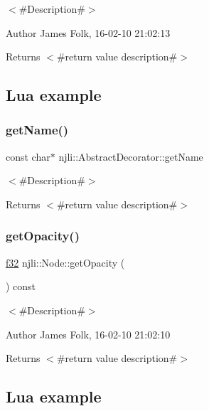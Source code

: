 $<$\#\+Description\#$>$ 

\begin{DoxyAuthor}{Author}
James Folk, 16-\/02-\/10 21\+:02\+:13
\end{DoxyAuthor}
\begin{DoxyReturn}{Returns}
$<$\#return value description\#$>$
\end{DoxyReturn}
\hypertarget{classnjli_1_1_steering_behavior_wander_ex1}{}\subsection{Lua example}\label{classnjli_1_1_steering_behavior_wander_ex1}

\begin{DoxyCodeInclude}
\end{DoxyCodeInclude}
\mbox{\label{classnjli_1_1_node_ad41266885be835f3ee602311e20877a4}} 
\subsubsection{\texorpdfstring{get\+Name()}{getName()}}
{\footnotesize\ttfamily const char$\ast$ njli\+::\+Abstract\+Decorator\+::get\+Name}

$<$\#\+Description\#$>$

\begin{DoxyReturn}{Returns}
$<$\#return value description\#$>$ 
\end{DoxyReturn}
\mbox{\label{classnjli_1_1_node_ad399157554c53eaee612b8bce47bdf26}} 
\subsubsection{\texorpdfstring{get\+Opacity()}{getOpacity()}}
{\footnotesize\ttfamily \mbox{\hyperlink{_util_8h_a5f6906312a689f27d70e9d086649d3fd}{f32}} njli\+::\+Node\+::get\+Opacity (\begin{DoxyParamCaption}{ }\end{DoxyParamCaption}) const}



$<$\#\+Description\#$>$ 

\begin{DoxyAuthor}{Author}
James Folk, 16-\/02-\/10 21\+:02\+:10
\end{DoxyAuthor}
\begin{DoxyReturn}{Returns}
$<$\#return value description\#$>$
\end{DoxyReturn}
\hypertarget{classnjli_1_1_steering_behavior_wander_ex1}{}\subsection{Lua example}\label{classnjli_1_1_steering_behavior_wander_ex1}

